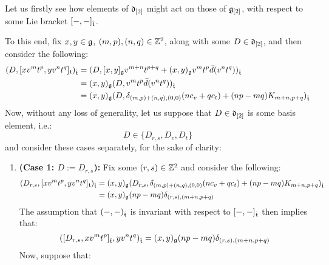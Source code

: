         \begin{remark} \label{remark: derivation_action_on_multiloop_algebras}
            Let us firstly see how elements of $\mathfrak{d}_{[2]}$ might act on those of $\mathfrak{g}_{[2]}$, with respect to some Lie bracket $[-, -]_{\hat{\mathfrak{t}}}$. 

            To this end, fix $x, y \in \mathfrak{g}$, $(m, p), (n, q) \in \mathbb{Z}^2$, along with some $D \in \mathfrak{d}_{[2]}$, and then consider the following:
                $$
                    \begin{aligned}
                        ( D, [x v^m t^p, y v^n t^q]_{\mathfrak{t}} )_{\hat{\mathfrak{t}}} & = ( D, [x, y]_{\mathfrak{g}} v^{m + n} t^{p + q} + (x, y)_{\mathfrak{g}} v^m t^p \bar{d}( v^n t^q ) )_{\hat{\mathfrak{t}}}
                        \\
                        & = (x, y)_{\mathfrak{g}} ( D, v^m t^p \bar{d}( v^n t^q ) )_{\hat{\mathfrak{t}}}
                        \\
                        & = (x, y)_{\mathfrak{g}} ( D, \delta_{(m, p) + (n, q), (0, 0)} ( n c_v + q c_t ) + (np - mq) K_{m + n, p + q} )_{\hat{\mathfrak{t}}}
                    \end{aligned}
                $$
            Now, without any loss of generality, let us suppose that $D \in \mathfrak{d}_{[2]}$ is some basis element, i.e.:
                $$D \in \{ D_{r, s}, D_v, D_t \}$$
            and consider these cases separately, for the sake of clarity:
            \begin{enumerate}
                \item \textbf{(Case 1: $D := D_{r, s}$):} Fix some $(r, s) \in \mathbb{Z}^2$ and consider the following: 
                    $$
                        \begin{aligned}
                            ( D_{r, s}, [x v^m t^p, y v^n t^q]_{\mathfrak{t}} )_{\hat{\mathfrak{t}}} & = (x, y)_{\mathfrak{g}} ( D_{r, s}, \delta_{(m, p) + (n, q), (0, 0)} ( n c_v + q c_t ) + (np - mq) K_{m + n, p + q} )_{\hat{\mathfrak{t}}}
                            \\
                            & = (x, y)_{\mathfrak{g}} (np - mq) \delta_{(r, s), (m + n, p + q)}
                        \end{aligned}
                    $$
                The assumption that $(-, -)_{\hat{\mathfrak{t}}}$ is invariant with respect to $[-, -]_{\hat{\mathfrak{t}}}$ then implies that:
                    $$( [D_{r, s}, x v^m t^p]_{\hat{\mathfrak{t}}}, y v^n t^q )_{\hat{\mathfrak{t}}} = (x, y)_{\mathfrak{g}} (np - mq) \delta_{(r, s), (m + n, p + q)}$$
                Now, suppose that:

\end{enumerate}
\end{remark}
